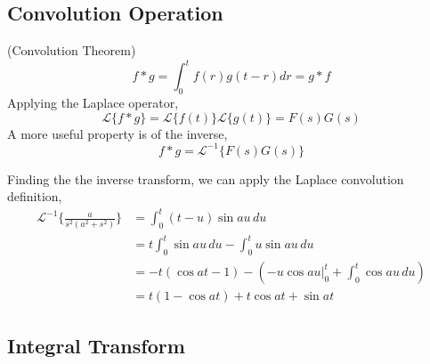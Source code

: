\subsection{Convolution Operation}

\begin{definition} (Convolution Theorem)
    \begin{equation}
        f * g = \int_0^t f(r) g(t-r)dr=g * f
    \end{equation}
    Applying the Laplace operator,
    \begin{equation}
        \mathcal{L}\{f*g\}=\mathcal{L}\{f(t)\}\mathcal{L}\{g(t)\}=F(s)G(s)
    \end{equation}
    A more useful property is of the inverse,
    \begin{equation}
        f*g=\mathcal{L}^{-1}\{F(s)G(s)\}
    \end{equation}
\end{definition}

\begin{example}
    Finding the the inverse transform, we can apply the Laplace convolution definition,
    \begin{align*}
        \mathcal{L}^{-1}\{\frac{a}{s^2(a^2+s^2)}\}&=\int_0^t (t-u)\sin au\,du\\
        &=t\int_0^t \sin au\, du -\int_0^t u\sin au\, du\\
        &=-t(\cos at - 1)-\left(-u\cos au\bigg\vert_0^t+\int_0^t \cos au\,du\right)\\
        &=t(1-\cos at)+t\cos at+\sin at
    \end{align*}
\end{example}

\subsection{Integral Transform}